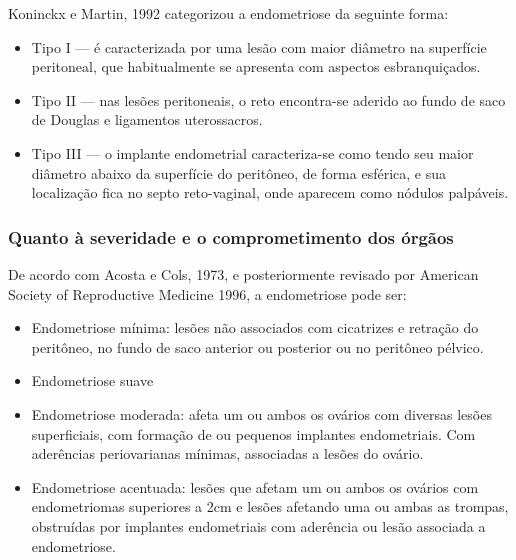 \documentclass[12pt]{article} %
\begin{document}
Koninckx e Martin, 1992 categorizou a endometriose da seguinte forma:

\begin{itemize}
\item Tipo I --- é caracterizada por uma lesão com maior diâmetro na
  superfície peritoneal, que habitualmente se apresenta com aspectos
  esbranquiçados.
\item Tipo II --- nas lesões peritoneais, o reto encontra-se aderido ao
  fundo de saco de Douglas e ligamentos uterossacros.
\item Tipo III --- o implante endometrial caracteriza-se como tendo
  seu maior diâmetro abaixo da superfície do peritôneo, de forma
  esférica, e sua localização fica no septo reto-vaginal, onde
  aparecem como nódulos palpáveis.
\end{itemize}

\subsubsection{Quanto à severidade e o comprometimento dos órgãos}

De acordo com Acosta e Cols, 1973, e posteriormente revisado por American Society of Reproductive Medicine 1996, a endometriose pode ser:


\begin{itemize}
\item Endometriose mínima: lesões não associados com cicatrizes e
  retração do peritôneo, no fundo de saco anterior ou posterior ou no
  peritôneo pélvico.
\item Endometriose suave
\item Endometriose moderada: afeta um ou ambos os ovários com diversas
  lesões superficiais, com formação de  ou pequenos
  implantes endometriais. Com aderências periovarianas mínimas,
  associadas a lesões do ovário.
\item Endometriose acentuada: lesões que afetam um ou ambos os ovários
  com endometriomas superiores a 2cm e lesões afetando uma ou ambas as
  trompas, obstruídas por implantes endometriais com aderência ou
  lesão associada a endometriose.
\end{itemize}
\newpage
\end{document}
